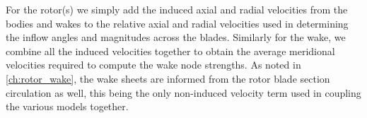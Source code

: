 For the rotor(s) we simply add the induced axial and radial velocities from the bodies and wakes to the relative axial and radial velocities used in determining the inflow angles and magnitudes across the blades.
%
Similarly for the wake, we combine all the induced velocities together to obtain the average meridional velocities required to compute the wake node strengths.
%
As noted in \cref{ch:rotor_wake}, the wake sheets are informed from the rotor blade section circulation as well, this being the only non-induced velocity term used in coupling the various models together.
